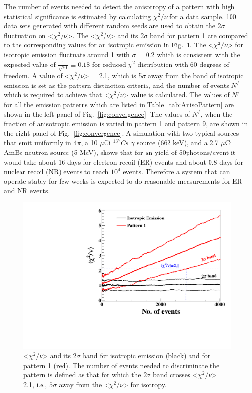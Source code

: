 The number of events needed to detect the anisotropy of a pattern with 
high statistical significance is estimated by calculating $\chi^2/\nu$ 
for a data sample. 100 data sets generated with different random seeds are 
used to obtain the 2$\sigma$ fluctuation on <$\chi^2/\nu$>. The <$\chi^2/\nu$> 
and its 2$\sigma$ band for pattern 1 are compared to the corresponding values 
for an isotropic emission in Fig.~\ref{fig:pattern1}. The <$\chi^2/\nu$> for 
isotropic emission fluctuate around 1 with $\sigma$ = 0.2 which is consistent with 
the expected value of $\frac{1}{\sqrt{30}} \equiv 0.18$ for reduced $\chi^2$ distribution 
with 60 degrees of freedom. A value of <$\chi^2/\nu$> = 2.1, which is 5$\sigma$ away from the 
band of isotropic emission is set as the pattern distinction criteria, and the number of events 
$N^{/}$ which is required to achieve that <$\chi^2/\nu$> value is calculated. The values of 
$N^{/}$ for all the emission patterns which are listed in Table~\ref{tab:AnisoPattern} are shown 
in the left panel of Fig.~\ref{fig:convergence}. The values of $N^{/}$, when the fraction of anisotropic 
emission is varied in pattern 1 and pattern 9, are shown in the right panel of Fig.~\ref{fig:convergence}. 
A simulation with two typical sources that emit uniformly in 4$\pi$, a 10 $\mu$Ci $^{137}Cs$ $\gamma$ 
source (662 keV), and a 2.7 $\mu$Ci AmBe neutron source (5 MeV), shows that for an yield of 
50photons/event it would take about 16 days for electron recoil (ER) events and about 0.8 days for 
nuclear recoil (NR) events to reach $10^4$ events. Therefore a system that can operate stably for few weeks 
is expected to do reasonable measurements for ER and NR events.

\begin{figure}[h]
\centerline{\includegraphics[width=0.5\linewidth]{Pattern1.pdf}}
\caption{<$\chi^2/\nu$> and its $2\sigma$ band for isotropic emission (black) and for pattern 1 (red). 
The number of events needed to discriminate the pattern is defined as that for which 
the $2\sigma$ band crosses <$\chi^2/\nu$> = 2.1, i.e., $5\sigma$ away from the <$\chi^2/\nu$> for isotropy. }
\label{fig:pattern1}
\end{figure}

